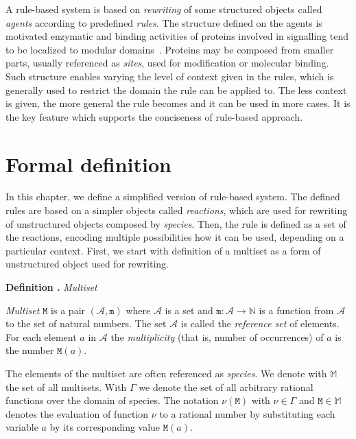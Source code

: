 \documentclass[11pt,a4paper]{report}
\newcounter{counter}[section]
\renewcommand{\thecounter}{\thechapter.\arabic{counter}}
\newenvironment{definition}[1]{\bigskip\refstepcounter{counter}\noindent\textbf{Definition \thecounter } \emph{#1} \par\nopagebreak\noindent \begin{itshape}}{\end{itshape}\bigskip}
\begin{document}
A rule-based system is based on \emph{rewriting} of some structured objects called \emph{agents} according to predefined \emph{rules}. The structure defined on the agents is motivated enzymatic and binding activities of proteins involved in signalling tend to be localized to modular domains~\cite{pawson2003assembly}. Proteins may be composed from smaller parts, usually referenced as \emph{sites}, used for modification or molecular binding. Such structure enables varying the level of context given in the rules, which is generally used to restrict the domain the rule can be applied to. The less context is given, the more general the rule becomes and it can be used in more cases. It is the key feature which supports the conciseness of rule-based approach.

\section{Formal definition}

In this chapter, we define a simplified version of rule-based system. The defined rules are based on a simpler objects called \emph{reactions}, which are used for rewriting of unstructured objects composed by \emph{species}. Then, the rule is defined as a set of the reactions, encoding multiple possibilities how it can be used, depending on a particular context. First, we start with definition of a multiset as a form of unstructured object used for rewriting.

\begin{definition}{Multiset}
\emph{Multiset} $\mathtt{M}$ is a pair $(\mathcal{A}, \mathtt{m})$ where $\mathcal{A}$ is a set and $ \mathtt{m} : \mathcal{A} \rightarrow \mathbb{N} $ is a function from $\mathcal{A}$ to the set of natural numbers. The set $\mathcal{A}$ is called the \emph{reference set} of elements. For each element $\mathit{a}$ in $\mathcal{A}$ the \emph{multiplicity} (that is, number of occurrences) of $\mathit{a}$ is the number $\mathtt{M}(\mathit{a})$.
\end{definition}

The elements of the multiset are often referenced as \emph{species}. We denote with $\mathbb{M}$ the set of all multisets. With $\Gamma$ we denote the set of all arbitrary rational functions over the domain of species. The notation $\nu(\mathtt{M})$ with $\nu \in \Gamma$ and $\mathtt{M} \in \mathbb{M}$ denotes the evaluation of function $\nu$ to a rational number by substituting each variable $\mathit{a}$ by its corresponding value $\mathtt{M}(\mathit{a})$.
\end{document}
